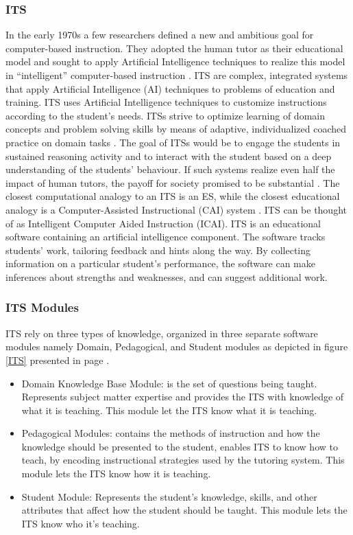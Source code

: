 \documentclass[12pt,a4paper,final,twoside,onecolumn,titlepage]{book}
\begin{document}
\subsubsection{ITS}
In the early 1970s a few researchers defined a new and ambitious goal for computer-based instruction. They adopted the human tutor as their educational model and sought to apply Artificial Intelligence techniques to realize this model in “intelligent” computer-based instruction \cite{R47}.
\gls{ITS} are complex, integrated systems that apply Artificial Intelligence (AI) techniques to problems of education and training. \gls{ITS} uses Artificial Intelligence techniques to customize instructions according to the student’s needs. ITSs strive to optimize learning of domain concepts and problem solving skills by means of adaptive, individualized coached practice on domain tasks \cite{R48}.
The goal of ITSs would be to engage the students in sustained reasoning activity and to interact with the student based on a deep understanding of the students’ behaviour. If such systems realize even half the impact of human tutors, the payoff for society promised to be substantial \cite{R47}. 
The closest computational analogy to an \gls{ITS} is an \gls{ES}, while the closest educational analogy is a Computer-Assisted Instructional (CAI) system \cite{R49}. \gls{ITS} can be thought of as Intelligent Computer Aided Instruction (ICAI).  \gls{ITS} is an educational software containing an artificial intelligence component. The software tracks students' work, tailoring feedback and hints along the way. By collecting information on a particular student's performance, the software can make inferences about strengths and weaknesses, and can suggest additional work.

\subsubsection{ITS Modules}
\gls{ITS} rely on three types of knowledge, organized in three separate software modules namely Domain, Pedagogical, and Student modules as depicted in figure \ref{ITS} presented in page \pageref{ITS} \cite{R08,R48}.
\begin{itemize}
\item Domain Knowledge Base Module: is the set of questions being taught. Represents subject matter expertise and provides the \gls{ITS} with knowledge of what it is teaching. This module let the \gls{ITS} know what it is teaching.
\item Pedagogical Modules: contains the methods of instruction and how the knowledge should be presented to the student, enables \gls{ITS} to know how to teach, by encoding instructional strategies used by the tutoring system. This module lets the \gls{ITS} know how it is teaching.
\item Student Module: Represents the student’s knowledge, skills, and other attributes that affect how the student should be taught. This module lets the \gls{ITS} know who it’s teaching.
\end{itemize}
\end{document}
